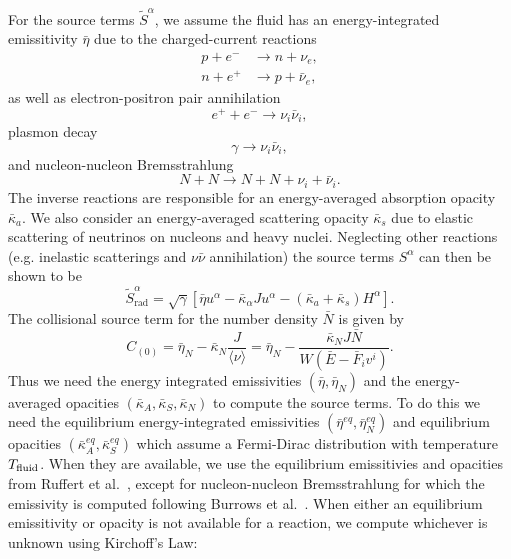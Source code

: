 For the source terms $\tilde{S}^\alpha$, we assume the fluid has an energy-integrated emissitivity $\bar \eta$ due to the charged-current reactions
%
\begin{align}
  p + e^- &\rightarrow n + \nu_e, \\
  n + e^+ &\rightarrow p + \bar{\nu}_e,
\end{align}
%
as well as electron-positron pair annihilation
%
\begin{equation}
  e^+ + e^- \rightarrow \nu_i \bar \nu_i,
\end{equation}
%
plasmon decay
%
\begin{equation}
  \gamma \rightarrow \nu_i\bar \nu_i,
\end{equation}
%
and nucleon-nucleon Bremsstrahlung
%
\begin{equation}
  N + N \rightarrow N + N + \nu_i + \bar \nu_i.
\end{equation}
%
The inverse reactions are responsible for an energy-averaged absorption opacity $\bar \kappa_a$. We also consider an energy-averaged scattering opacity $\bar \kappa_s$ due to elastic scattering of neutrinos on nucleons and heavy nuclei. Neglecting other reactions (e.g. inelastic scatterings and $\nu\bar\nu$ annihilation) the source terms $S^\alpha$ can then be shown to be \cite{shibata2011truncated}
%
\begin{equation}
  \tilde S_\text{rad}^\alpha = \sqrt{\gamma} [\bar \eta u^\alpha - \bar \kappa_\alpha J u^\alpha - (\bar \kappa_a + \bar \kappa_s) H^\alpha].
\end{equation}
%
The collisional source term for the number density $\bar N$ is given by
%
\begin{equation}
  C_{(0)} = \bar \eta_N - \bar \kappa_N \frac{J}{\langle\nu\rangle} = \bar \eta_N - \frac{\bar \kappa_N J \bar N}{W(\bar E - \bar F_iv^i)}.
\end{equation}
%
Thus we need the energy integrated emissivities $(\bar \eta, \bar \eta_N)$ and the energy-averaged opacities $(\bar \kappa_A, \bar \kappa_S, \bar \kappa_N)$ to compute the source terms. To do this we need the equilibrium energy-integrated emissivities $(\bar \eta^{eq}, \bar \eta^{eq}_N)$ and equilibrium opacities $(\bar \kappa^{eq}_A, \bar \kappa^{eq}_S)$ which assume a Fermi-Dirac distribution with temperature $T_{\rm fluid}$. When they are available, we use the equilibrium emissitivies and opacities from Ruffert et al.~\cite{ruffert1996}, except for nucleon-nucleon Bremsstrahlung for which the emissivity is computed following Burrows et al.~\cite{burrows2006b}. When either an equilibrium emissitivity or opacity is not available for a reaction, we compute whichever is unknown using Kirchoff's Law:

